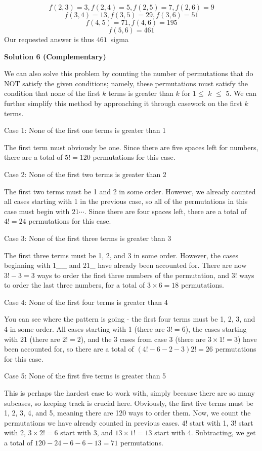 \begin{enumerate}
 
 \[f(2,3)=3, f(2,4)=5, f(2,5)=7, f(2,6)=9\]
 \[f(3,4)=13, f(3,5)=29, f(3,6)=51\]
 \[f(4,5)=71, f(4,6)=195\]
 \[f(5,6)=461\]Our requested answer is thus $\boxed{461}$~sigma

 



\textbf{Solution 6 (Complementary)}

We can also solve this problem by counting the number of permutations that do NOT satisfy the given conditions; namely, these permutations must satisfy the condition that none of the first $k$ terms is greater than $k$ for $1\leq$ $k$ $\leq$ $5$. We can further simplify this method by approaching it through casework on the first $k$ terms.

 Case 1: None of the first one terms is greater than 1

 The first term must obviously be one. Since there are five spaces left for numbers, there are a total of $5!=120$ permutations for this case.

 Case 2: None of the first two terms is greater than 2

 The first two terms must be 1 and 2 in some order. However, we already counted all cases starting with 1 in the previous case, so all of the permutations in this case must begin with $21\cdots$. Since there are four spaces left, there are a total of $4!=24$ permutations for this case.

 Case 3: None of the first three terms is greater than 3

 The first three terms must be 1, 2, and 3 in some order. However, the cases beginning with 1\_\_ and 21\_ have already been accounted for. There are now $3!-3 = 3$ ways to order the first three numbers of the permutation, and $3!$ ways to order the last three numbers, for a total of $3\times6 = 18$ permutations.

 Case 4: None of the first four terms is greater than 4

 You can see where the pattern is going - the first four terms must be 1, 2, 3, and 4 in some order. All cases starting with 1 (there are $3!=6$), the cases starting with 21 (there are $2!=2$), and the 3 cases from case 3 (there are $3\times 1! = 3$) have been accounted for, so there are a total of $(4!-6-2-3)2!=26$ permutations for this case.

 Case 5: None of the first five terms is greater than 5

 This is perhaps the hardest case to work with, simply because there are so many subcases, so keeping track is crucial here. Obviously, the first five terms must be 1, 2, 3, 4, and 5, meaning there are 120 ways to order them. Now, we count the permutations we have already counted in previous cases. $4!$ start with 1, $3!$ start with 2, $3\times2!=6$ start with 3, and $13\times1!=13$ start with 4. Subtracting, we get a total of $120-24-6-6-13=71$ permutations.


\end{enumerate}
